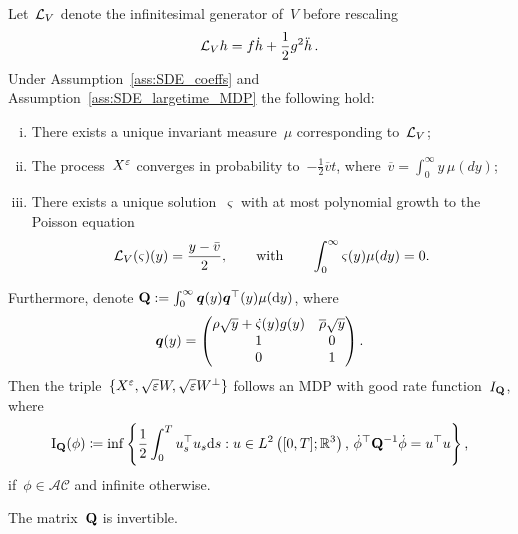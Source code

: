 \begin{theorem}\label{thm:limitPoisson}
Let~$\mathcal{L}_{V}$ denote the infinitesimal generator of~$V$ before rescaling
\[
\mathcal{L}_V h = f\dot{h} + \frac{1}{2}g^2\ddot{h}\,.
\]
Under Assumption~\ref{ass:SDE_coeffs} and Assumption~\ref{ass:SDE_largetime_MDP} the following hold:
\begin{enumerate}[i)]
    \item There exists a unique invariant measure~$\mu$ corresponding to~$\mathcal{L}_V$;
    \item The process~$X^{\varepsilon}$ converges in probability to~$-\frac{1}{2}\overline{v}t$, where~$\overline{v} = \int_0^\infty y \, \mu(dy)$;
    \item There exists a unique solution~$\varsigma$ with at most polynomial growth to the Poisson equation
    \[
    \mathcal{L}_V(\varsigma)(y) = \frac{y - \bar{v}}{2}, 
    \qquad \text{with} \qquad \int_0^\infty \varsigma(y)\mu(dy)=0.
    \]
\end{enumerate}
Furthermore, denote 
$\boldsymbol{\mathrm{Q}}:=\int_0^\infty\boldsymbol{q}(y)\boldsymbol{q}^\top(y)\mu(\mathrm{d} y)$, where
$$
\boldsymbol{q}(y) =
\begin{pmatrix}
\rho\sqrt{y} + \dot{\varsigma}(y)g(y) & \overline{\rho}\sqrt{y}\\
1 & 0 \\
0 & 1 \\
\end{pmatrix}.
$$
Then the triple~$\{X^{\varepsilon},\sqrt{\varepsilon}W,\sqrt{\varepsilon}W^{\perp}\}$ follows an MDP with good rate function~$I_{\boldsymbol{\mathrm{Q}}}$,
where
$$
\mathrm{I}_{\boldsymbol{\mathrm{Q}}}(\phi) \coloneqq 
\inf \left\{\frac{1}{2}\int_0^T u_s^\top u_s\mathrm{d} s: u\in L^2\left([0,T]; \mathbb{R}^3\right), \, \dot{\phi}^\top \boldsymbol{\mathrm{Q}}^{-1} \dot{\phi} = u^\top u \right\},
$$
if~$\phi\in\mathcal{AC}$ and infinite otherwise.
\end{theorem}
\begin{lemma}\label{q-invertible}
The matrix~$\boldsymbol{\mathrm{Q}}$ is invertible. 
\end{lemma}
